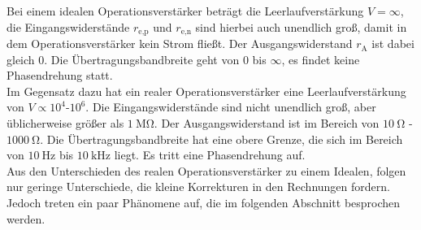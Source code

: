        Bei einem idealen Operationsverstärker beträgt die Leerlaufverstärkung $V = \infty$, die Eingangswiderstände $r_\text{e,p}$ und $r_\text{e,n}$ sind hierbei auch unendlich 
        groß, damit in dem Operationsverstärker kein Strom fließt. 
        Der Ausgangswiderstand $r_\text{A}$ ist dabei gleich $0$. Die Übertragungsbandbreite geht von $0$ bis $\infty$, es findet keine Phasendrehung statt. \\ 
        Im Gegensatz dazu hat ein realer Operationsverstärker eine Leerlaufverstärkung von $V \propto 10^4$-$10^6$. 
        Die Eingangswiderstände sind nicht unendlich groß, aber üblicherweise größer als $\SI{1}{\mega\ohm}$. 
        Der Ausgangswiderstand ist im Bereich von $\SI{10}{\ohm}$ - $\SI{1000}{\ohm}$. 
        Die Übertragungsbandbreite hat eine obere Grenze, die sich im Bereich von $\SI{10}{\hertz}$ bis $\SI{10}{\kilo\hertz}$ liegt.
        Es tritt eine Phasendrehung auf. \\
        Aus den Unterschieden des realen Operationsverstärker zu einem Idealen, folgen nur geringe Unterschiede, die kleine Korrekturen in den Rechnungen fordern. 
        Jedoch treten ein paar Phänomene auf, die im folgenden Abschnitt besprochen werden. \\

